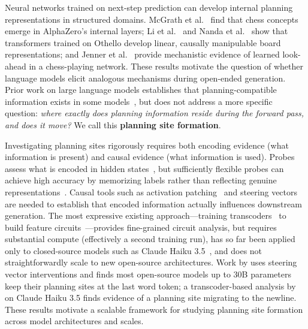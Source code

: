 \documentclass{article}
\begin{document}
Neural networks trained on next-step prediction can develop internal planning representations in structured domains. McGrath et al.~\citeyearpar{mcgrath22} find that chess concepts emerge in AlphaZero's internal layers; Li et al.~\citeyearpar{li24} and Nanda et al.~\citeyearpar{nanda23} show that transformers trained on Othello develop linear, causally manipulable board representations; and Jenner et al.~\citeyearpar{jenner24} provide mechanistic evidence of learned look-ahead in a chess-playing network. These results motivate the question of whether language models elicit analogous mechanisms during open-ended generation. Prior work on large language models establishes that planning-compatible information exists in some models~\citep{maar2026whatsplanmetricsimplicit,hanna2026latent,dong2025emergentresponseplanningllms,pochinkov2025parascopeslanguagemodelsactivations}, but does not address a more specific question: \textit{where exactly does planning information reside during the forward pass, and does it move?} We call this \textbf{planning site formation}.

Investigating planning sites rigorously requires both encoding evidence (what information is present) and causal evidence (what information is used). Probes assess what is encoded in hidden states~\citep{hewitt19,burns24}, but sufficiently flexible probes can achieve high accuracy by memorizing labels rather than reflecting genuine representations~\citep{hewitt19}. Causal tools such as activation patching~\citep{meng23,wang2022ioi} and steering vectors~\citep{turner2023activation,arditi2024refusal} are needed to establish that encoded information actually influences downstream generation. The most expressive existing approach---training transcoders~\citep{transcoders} to build feature circuits~\citep{sparsefeaturecircuits,ameisen2025circuittracing}---provides fine-grained circuit analysis, but requires substantial compute (effectively a second training run), has so far been applied only to closed-source models such as Claude Haiku 3.5~\citep{anthropic-bio}, and does not straightforwardly scale to new open-source architectures. Work by \citet{maar2026whatsplanmetricsimplicit} uses steering vector interventions and finds most open-source models up to 30B parameters keep their planning sites at the last word token; a transcoder-based analysis by \citet{anthropic-bio} on Claude Haiku 3.5 finds evidence of a planning site migrating to the newline. These results motivate a scalable framework for studying planning site formation across model architectures and scales.
\end{document}
